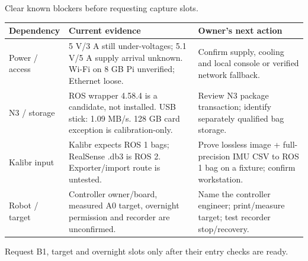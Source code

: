 \begin{frame}{Clear known blockers before requesting capture slots.}
\small\renewcommand{\arraystretch}{1.25}
\begin{tabular}{@{}L{31mm}L{78mm}L{73mm}@{}}\toprule
\textbf{Dependency} & \textbf{Current evidence} & \textbf{Owner's next action}\\\midrule
Power / access & 5 V/3 A still under-voltages; 5.1 V/5 A supply arrival unknown. Wi-Fi on 8 GB Pi unverified; Ethernet loose. & Confirm supply, cooling and local console or verified network fallback.\\
N3 / storage & ROS wrapper 4.58.4 is a candidate, not installed. USB stick: 1.09 MB/s. 128 GB card exception is calibration-only. & Review N3 package transaction; identify separately qualified bag storage.\\
Kalibr input & Kalibr expects ROS 1 bags; RealSense .db3 is ROS 2. Exporter/import route is untested. & Prove lossless image + full-precision IMU CSV to ROS 1 bag on a fixture; confirm workstation.\\
Robot / target & Controller owner/board, measured A0 target, overnight permission and recorder are unconfirmed. & Name the controller engineer; print/measure target; test recorder stop/recovery.\\\bottomrule
\end{tabular}
\par\medskip\normalsize Request B1, target and overnight slots only after their entry checks are ready.
\vfill{}
\end{frame}

